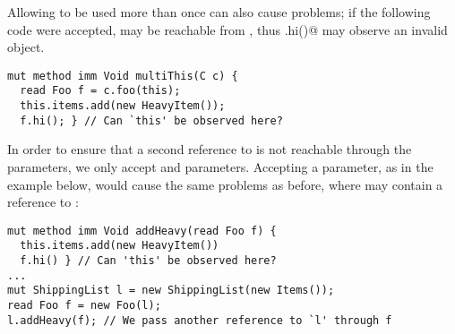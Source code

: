 

Allowing \Q@this@ to be used more than once can also cause problems;
if the following code were accepted, 
\Q@this@ may be reachable from \Q@f@, thus \Q@f.hi()@ may observe an invalid object.
\begin{lstlisting}
mut method imm Void multiThis(C c) {
  read Foo f = c.foo(this);
  this.items.add(new HeavyItem());
  f.hi(); } // Can `this' be observed here?
\end{lstlisting}

In order to ensure that a second reference to \Q@this@ is not reachable through the parameters, we only accept \Q@imm@ and \Q@capsule@ parameters.
Accepting a \Q@read@ parameter, as in the example below,
would cause the same problems as before, where \Q@f@ may contain
a reference to \Q@this@:
\begin{lstlisting}
mut method imm Void addHeavy(read Foo f) {
  this.items.add(new HeavyItem())
  f.hi() } // Can 'this' be observed here?
...
mut ShippingList l = new ShippingList(new Items());
read Foo f = new Foo(l);
l.addHeavy(f); // We pass another reference to `l' through f
\end{lstlisting}


